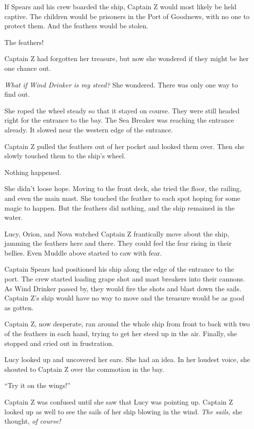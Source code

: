 \documentclass[12pt]{extbook}
\begin{document}
  If Spears and his crew boarded the ship, Captain Z would most likely be
  held captive. The children would be prisoners in the Port of Goodnews,
  with no one to protect them. And the feathers would be stolen.
  
  The feathers!
  
  Captain Z had forgotten her treasure, but now she wondered if they might
  be her one chance out.
  
  \emph{What if Wind Drinker is my steed?} She wondered. There was only
  one way to find out.
  
  She roped the wheel steady so that it stayed on course. They were still
  headed right for the entrance to the bay. The Sea Breaker was reaching
  the entrance already. It slowed near the western edge of the entrance.
  
  Captain Z pulled the feathers out of her pocket and looked them over.
  Then she slowly touched them to the ship's wheel.
  
  Nothing happened.
  
  She didn't loose hope. Moving to the front deck, she tried the floor,
  the railing, and even the main mast. She touched the feather to each
  spot hoping for some magic to happen. But the feathers did nothing, and
  the ship remained in the water.
  
  Lucy, Orion, and Nova watched Captain Z frantically move about the ship,
  jamming the feathers here and there. They could feel the fear rising in
  their bellies. Even Muddle above started to caw with fear.
  
  Captain Spears had positioned his ship along the edge of the entrance to
  the port. The crew started loading grape shot and mast breakers into
  their cannons. As Wind Drinker passed by, they would fire the shots and
  blast down the sails. Captain Z's ship would have no way to move and the
  treasure would be as good as gotten.
  
  Captain Z, now desperate, ran around the whole ship from front to back
  with two of the feathers in each hand, trying to get her steed up in the
  air. Finally, she stopped and cried out in frustration.
  
  Lucy looked up and uncovered her ears. She had an idea. In her loudest
  voice, she shouted to Captain Z over the commotion in the bay.
  
  \enquote{Try it on the wings!}
  
  Captain Z was confused until she saw that Lucy was pointing up. Captain
  Z looked up as well to see the sails of her ship blowing in the wind.
  \emph{The sails,} she thought, \emph{of course!}
  
\end{document}
